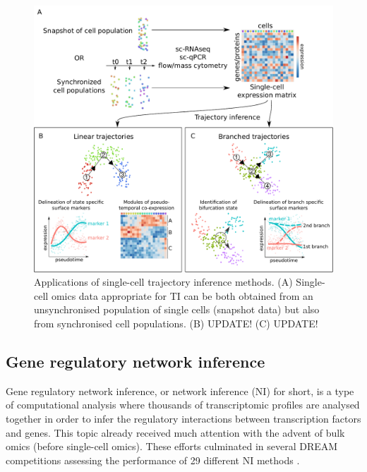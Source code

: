 \begin{figure}[htb!]
	\centering\includegraphics[width=\Largefigure]{fig/trajectory_inference_slim} %
	\caption{
		Applications of single-cell trajectory inference methods. (A) Single-cell omics data appropriate for TI can be both obtained from an unsynchronised population of single cells (snapshot data) but also from synchronised cell populations. (B) UPDATE! (C) UPDATE!
	}
	\label{fig:trajectory_inference}
\end{figure}


\subsection{Gene regulatory network inference}
Gene regulatory network inference, or network inference (NI) for short, is a type of computational analysis where thousands of transcriptomic profiles are analysed together in order to infer the regulatory interactions between transcription factors and genes. This topic already received much attention with the advent of bulk omics (before single-cell omics). These efforts culminated in several DREAM competitions assessing the performance of 29 different NI methods \cite{marbach_revealingstrengthsweaknesses_2010, marbach_wisdomcrowdsrobust_2012}. 

